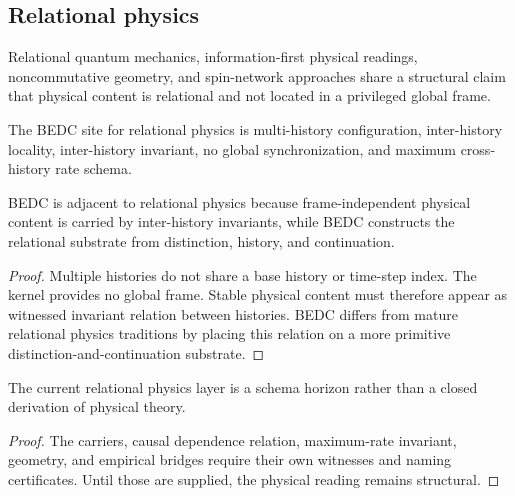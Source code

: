 \subsection{Relational physics}
\label{subsec:philosophy-relational-physics-tradition}

\begin{definition}
\label{def:philosophy-relational-physics-genealogy}
Relational quantum mechanics, information-first physical readings,
noncommutative geometry, and spin-network approaches share a structural
claim that physical content is relational and not located in a
privileged global frame.
\end{definition}

\begin{definition}
\label{def:philosophy-bedc-relational-physics-site}
The BEDC site for relational physics is multi-history configuration,
inter-history locality, inter-history invariant, no global
synchronization, and maximum cross-history rate schema.
\end{definition}

\begin{theorem}
\label{thm:philosophy-bedc-lower-level-relational-physics}
BEDC is adjacent to relational physics because frame-independent
physical content is carried by inter-history invariants, while BEDC
constructs the relational substrate from distinction, history, and
continuation.
\end{theorem}
\begin{proof}
Multiple histories do not share a base history or time-step index. The
kernel provides no global frame. Stable physical content must therefore
appear as witnessed invariant relation between histories. BEDC differs
from mature relational physics traditions by placing this relation on a
more primitive distinction-and-continuation substrate.
\end{proof}

\begin{corollary}
\label{cor:philosophy-relational-physics-schema-horizon}
The current relational physics layer is a schema horizon rather than a
closed derivation of physical theory.
\end{corollary}
\begin{proof}
The carriers, causal dependence relation, maximum-rate invariant,
geometry, and empirical bridges require their own witnesses and naming
certificates. Until those are supplied, the physical reading remains
structural.
\end{proof}

